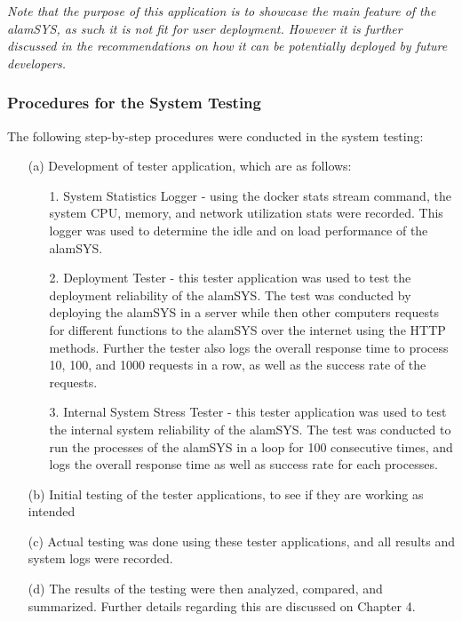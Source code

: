 \textit{Note that the purpose of this application is to showcase the main feature of
the alamSYS, as such it is not fit for user deployment. However it is further discussed
in the recommendations on how it can be potentially deployed by future developers.}

\subsubsection{Procedures for the System Testing}
\label{subsubsec:proc_mobdev}
The following step-by-step procedures were conducted in the system testing:
\begin{itemize}
    \item[(a)] Development of tester application, which are as follows:
    \begin{itemize}
        \item[1.] System Statistics Logger - using the docker stats stream command, the system 
        CPU, memory, and network utilization stats were recorded. This logger was used
        to determine the idle and on load performance of the alamSYS.
        \item[2.] Deployment Tester - this tester application was used to test the deployment
        reliability of the alamSYS. The test was conducted by deploying the alamSYS in a server
        while then other computers requests for different functions to the alamSYS over the internet
        using the HTTP methods. Further the tester also logs the overall response time to
        process 10, 100, and 1000 requests in a row, as well as the success rate of the
        requests.
        \item[3.] Internal System Stress Tester - this tester application was used to test the
        internal system reliability of the alamSYS. The test was conducted to run the processes
        of the alamSYS in a loop for 100 consecutive times, and logs the overall response time
        as well as success rate for each processes.
    \end{itemize}
    \item[(b)] Initial testing of the tester applications, to see if
    they are working as intended
    \item[(c)] Actual testing was done using these tester applications, and
    all results and system logs were recorded.
    \item[(d)] The results of the testing were then analyzed, compared, and summarized.
    Further details regarding this are discussed on Chapter 4.
\end{itemize}